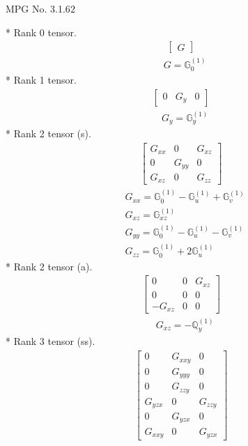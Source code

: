 \documentclass[fleqn,8pt,landscape]{jsarticle}
\begin{document}
\setcounter{MaxMatrixCols}{32}

\renewcommand{\tablename}{Table~}
\renewcommand{\figurename}{Figure~}
\begin{center}
\LARGE
MPG No. 3.1.6\quad$2$
\end{center}
* Rank 0 tensor.
\begin{align*}
\begin{bmatrix} G \end{bmatrix}
\end{align*}
\begin{align*}
& G = \mathbb{G}_{0}^{(1)}
\end{align*}
* Rank 1 tensor.
\begin{align*}
\begin{bmatrix} 0 & G_{y} & 0 \end{bmatrix}
\end{align*}
\begin{align*}
& G_{y} = \mathbb{G}_{y}^{(1)}
\end{align*}
* Rank 2 tensor (s).
\begin{align*}
\begin{bmatrix} G_{xx} & 0 & G_{xz} \\ 0 & G_{yy} & 0 \\ G_{xz} & 0 & G_{zz} \end{bmatrix}
\end{align*}
\begin{align*}
& G_{xx} = \mathbb{G}_{0}^{(1)} - \mathbb{G}_{u}^{(1)} + \mathbb{G}_{v}^{(1)} \\
& G_{xz} = \mathbb{G}_{xz}^{(1)} \\
& G_{yy} = \mathbb{G}_{0}^{(1)} - \mathbb{G}_{u}^{(1)} - \mathbb{G}_{v}^{(1)} \\
& G_{zz} = \mathbb{G}_{0}^{(1)} + 2 \mathbb{G}_{u}^{(1)}
\end{align*}
* Rank 2 tensor (a).
\begin{align*}
\begin{bmatrix} 0 & 0 & G_{xz} \\ 0 & 0 & 0 \\ - G_{xz} & 0 & 0 \end{bmatrix}
\end{align*}
\begin{align*}
& G_{xz} = - \mathbb{Q}_{y}^{(1)}
\end{align*}
* Rank 3 tensor (ss).
\begin{align*}
\begin{bmatrix} 0 & G_{xxy} & 0 \\ 0 & G_{yyy} & 0 \\ 0 & G_{zzy} & 0 \\ G_{yzx} & 0 & G_{zzy} \\ 0 & G_{yzx} & 0 \\ G_{xxy} & 0 & G_{yzx} \end{bmatrix}
\end{align*}
\end{document}
